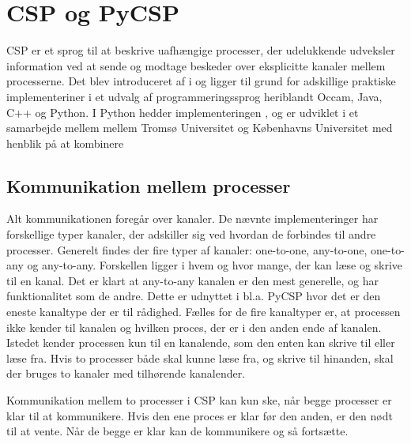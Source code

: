 \chapter{CSP og PyCSP}\label{sec:csp}
\inline{}
CSP er et sprog til at beskrive uafhængige processer, der udelukkende udveksler information ved at sende og modtage beskeder over eksplicitte kanaler mellem processerne. Det blev introduceret af \citeauthor{hoare-csp} i \cite{hoare-csp} og ligger til grund for adskillige praktiske implementeriner i et udvalg af programmeringssprog heriblandt Occam, Java, C++ og Python\cite{May1983, jcsp, Brown2007, pycsp}. I Python hedder implementeringen \pycsp, og er udviklet i et samarbejde mellem mellem Tromsø Universitet og Københavns Universitet med henblik på at kombinere  

\section{Kommunikation mellem processer}
Alt kommunikationen foregår over kanaler. De nævnte implementeringer har forskellige typer kanaler, der adskiller sig ved  hvordan de forbindes til andre processer. Generelt findes der fire typer af kanaler: one-to-one, any-to-one, one-to-any og any-to-any. Forskellen ligger i hvem og hvor mange, der kan læse og skrive til en kanal. Det er klart at any-to-any kanalen er den mest generelle, og har funktionalitet som de andre. Dette er udnyttet i bl.a. PyCSP hvor det er den eneste kanaltype der er til rådighed. Fælles for de fire kanaltyper er, at processen ikke kender til kanalen og hvilken proces, der er i den anden ende af kanalen. Istedet kender processen kun til en  kanalende, som  den enten kan skrive til eller læse fra. Hvis to processer både skal kunne læse fra, og skrive til hinanden, skal der bruges to kanaler med tilhørende kanalender. 

Kommunikation mellem to processer i CSP kan kun ske, når begge processer er klar til at kommunikere. Hvis den ene proces er klar før den anden, er den nødt til at vente. Når de begge er klar kan de kommunikere og så fortsætte.

